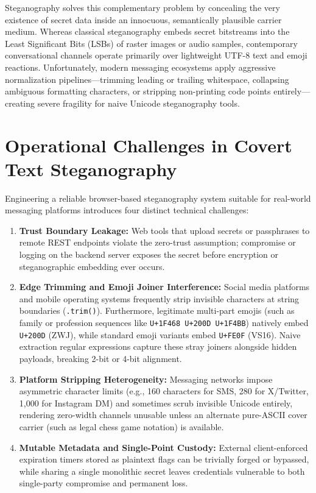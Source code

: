 \documentclass[12pt,a4paper,oneside,openany]{report}
\begin{document}
Steganography solves this complementary problem by concealing the very existence of secret data inside an innocuous, semantically plausible carrier medium. Whereas classical steganography embeds secret bitstreams into the Least Significant Bits (LSBs) of raster images or audio samples, contemporary conversational channels operate primarily over lightweight UTF-8 text and emoji reactions. Unfortunately, modern messaging ecosystems apply aggressive normalization pipelines---trimming leading or trailing whitespace, collapsing ambiguous formatting characters, or stripping non-printing code points entirely---creating severe fragility for naive Unicode steganography tools.

\section{Operational Challenges in Covert Text Steganography}
Engineering a reliable browser-based steganography system suitable for real-world messaging platforms introduces four distinct technical challenges:
\begin{enumerate}[label=(\alph*)]
    \item \textbf{Trust Boundary Leakage:} Web tools that upload secrets or passphrases to remote REST endpoints violate the zero-trust assumption; compromise or logging on the backend server exposes the secret before encryption or steganographic embedding ever occurs.
    \item \textbf{Edge Trimming and Emoji Joiner Interference:} Social media platforms and mobile operating systems frequently strip invisible characters at string boundaries (\texttt{.trim()}). Furthermore, legitimate multi-part emojis (such as family or profession sequences like \texttt{U+1F468 U+200D U+1F4BB}) natively embed \texttt{U+200D} (ZWJ), while standard emoji variants embed \texttt{U+FE0F} (VS16). Naive extraction regular expressions capture these stray joiners alongside hidden payloads, breaking 2-bit or 4-bit alignment.
    \item \textbf{Platform Stripping Heterogeneity:} Messaging networks impose asymmetric character limits (e.g., 160 characters for SMS, 280 for X/Twitter, 1,000 for Instagram DM) and sometimes scrub invisible Unicode entirely, rendering zero-width channels unusable unless an alternate pure-ASCII cover carrier (such as legal chess game notation) is available.
    \item \textbf{Mutable Metadata and Single-Point Custody:} External client-enforced expiration timers stored as plaintext flags can be trivially forged or bypassed, while sharing a single monolithic secret leaves credentials vulnerable to both single-party compromise and permanent loss.
\end{enumerate}
\end{document}
